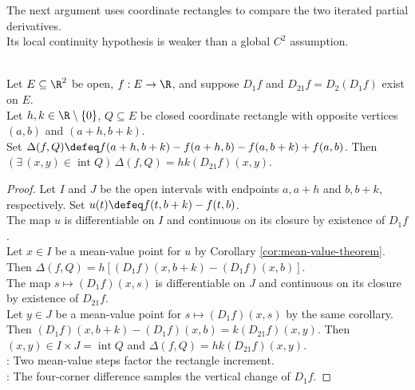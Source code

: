 The next argument uses coordinate rectangles to compare the two iterated partial derivatives.\\
Its local continuity hypothesis is weaker than a global $C^2$ assumption.

\begin{theorem} \label{thm:rectangle-mean-value-mixed-partial} \\
Let $E\subseteq\R^2$ be open, $f:E\to\R$, and suppose $D_1f$ and $D_{21}f=D_2(D_1f)$ exist on $E$.\\
Let $h,k\in\R\setminus\{0\}$, $Q\subseteq E$ be closed coordinate rectangle with opposite vertices $(a,b)$ and $(a+h,b+k)$.\\
Set $\Delta(f,Q)\defeq f(a+h,b+k)-f(a+h,b)-f(a,b+k)+f(a,b)$. Then $(\exists\,(x,y)\in\operatorname{int}Q)\, \Delta(f,Q)=hk(D_{21}f)(x,y)$.
\begin{proof}
Let $I$ and $J$ be the open intervals with endpoints $a,a+h$ and $b,b+k$, respectively. Set $u(t)\defeq f(t,b+k)-f(t,b)$.\\
The map $u$ is differentiable on $I$ and continuous on its closure by existence of $D_1f$.\\
Let $x\in I$ be a mean-value point for $u$ by Corollary \ref{cor:mean-value-theorem}. Then $\Delta(f,Q)=h[(D_1f)(x,b+k)-(D_1f)(x,b)]$.\\
The map $s\mapsto(D_1f)(x,s)$ is differentiable on $J$ and continuous on its closure by existence of $D_{21}f$.\\
Let $y\in J$ be a mean-value point for $s\mapsto(D_1f)(x,s)$ by the same corollary.\\
Then $(D_1f)(x,b+k)-(D_1f)(x,b)=k(D_{21}f)(x,y)$. Then $(x,y)\in I\times J=\operatorname{int}Q$ and $\Delta(f,Q)=hk(D_{21}f)(x,y)$.\\
: Two mean-value steps factor the rectangle increment.\\
: The four-corner difference samples the vertical change of $D_1f$.
\end{proof}
\end{theorem}


